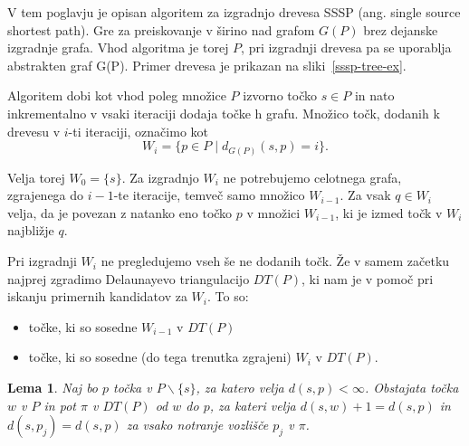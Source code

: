 \documentclass[a4paper, 12pt]{book}
\newtheorem{lema}[izrek]{Lema}
\begin{document}
V tem poglavju je opisan algoritem za izgradnjo drevesa SSSP (ang. single source shortest path). Gre za preiskovanje v širino nad grafom $G(P)$ brez dejanske izgradnje grafa. Vhod algoritma je torej $P$, pri izgradnji drevesa pa se uporablja abstrakten graf G(P). Primer drevesa je prikazan na sliki~\ref{sssp-tree-ex}.



Algoritem dobi kot vhod poleg množice $P$ izvorno točko $s\in P$ in nato inkrementalno v vsaki iteraciji dodaja točke h grafu. Množico točk, dodanih k drevesu v $i$-ti iteraciji, označimo kot
\[	W_i = \{ p\in P \mid d_{G(P)}(s,p) = i\}.
	\]

Velja torej $W_0 = \{s\}$. Za izgradnjo $W_i$ ne potrebujemo celotnega grafa, zgrajenega do $i-1$-te iteracije, temveč samo množico $W_{i-1}$.  Za vsak $q\in W_i$ velja, da je povezan z natanko eno točko $p$ v množici $W_{i-1}$,  ki je izmed točk v $W_i$ najbližje $q$.

Pri izgradnji $W_i$ ne pregledujemo vseh še ne dodanih točk. Že v samem začetku najprej zgradimo Delaunayevo triangulacijo $DT(P)$, ki nam je v pomoč pri iskanju primernih kandidatov za $W_i$. To so:

\begin{itemize}
\item točke, ki so sosedne $W_{i-1}$ v $DT(P)$
\item točke, ki so sosedne (do tega trenutka zgrajeni) $W_i$ v $DT(P)$.
\end{itemize} 

\begin{lema}
\label{lema1}
Naj bo $p$ točka v $P\backslash \{s\}$, za katero velja $d(s,p) < \infty$. Obstajata točka $w$ v $P$ in pot $\pi$ v $DT(P)$ od $w$ do $p$, za kateri velja $d(s,w)+1 = d(s,p)$ in $d(s,p_j) = d(s,p)$ za vsako notranje vozlišče $p_j$ v $\pi$.
\end{lema}
\end{document}
